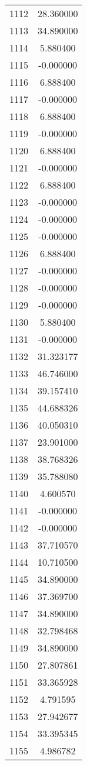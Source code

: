 \documentclass[12pt]{article}
\begin{document}
\begin{longtable}{@{}cc@{}}
1112 & 28.360000 \\
1113 & 34.890000 \\
1114 & 5.880400 \\
1115 & -0.000000 \\
1116 & 6.888400 \\
1117 & -0.000000 \\
1118 & 6.888400 \\
1119 & -0.000000 \\
1120 & 6.888400 \\
1121 & -0.000000 \\
1122 & 6.888400 \\
1123 & -0.000000 \\
1124 & -0.000000 \\
1125 & -0.000000 \\
1126 & 6.888400 \\
1127 & -0.000000 \\
1128 & -0.000000 \\
1129 & -0.000000 \\
1130 & 5.880400 \\
1131 & -0.000000 \\
1132 & 31.323177 \\
1133 & 46.746000 \\
1134 & 39.157410 \\
1135 & 44.688326 \\
1136 & 40.050310 \\
1137 & 23.901000 \\
1138 & 38.768326 \\
1139 & 35.788080 \\
1140 & 4.600570 \\
1141 & -0.000000 \\
1142 & -0.000000 \\
1143 & 37.710570 \\
1144 & 10.710500 \\
1145 & 34.890000 \\
1146 & 37.369700 \\
1147 & 34.890000 \\
1148 & 32.798468 \\
1149 & 34.890000 \\
1150 & 27.807861 \\
1151 & 33.365928 \\
1152 & 4.791595 \\
1153 & 27.942677 \\
1154 & 33.395345 \\
1155 & 4.986782 \\

\end{longtable}
\end{document}
